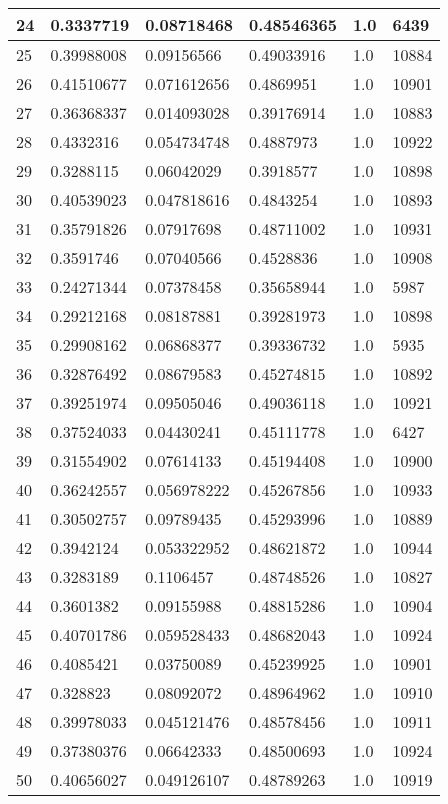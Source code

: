 \begin{longtable}{|l|l|l|l|l|l|}
24 & 0.3337719 & 0.08718468 & 0.48546365 & 1.0 & 6439 \\ \hline 
25 & 0.39988008 & 0.09156566 & 0.49033916 & 1.0 & 10884 \\ \hline 
26 & 0.41510677 & 0.071612656 & 0.4869951 & 1.0 & 10901 \\ \hline 
27 & 0.36368337 & 0.014093028 & 0.39176914 & 1.0 & 10883 \\ \hline 
28 & 0.4332316 & 0.054734748 & 0.4887973 & 1.0 & 10922 \\ \hline 
29 & 0.3288115 & 0.06042029 & 0.3918577 & 1.0 & 10898 \\ \hline 
30 & 0.40539023 & 0.047818616 & 0.4843254 & 1.0 & 10893 \\ \hline 
31 & 0.35791826 & 0.07917698 & 0.48711002 & 1.0 & 10931 \\ \hline 
32 & 0.3591746 & 0.07040566 & 0.4528836 & 1.0 & 10908 \\ \hline 
33 & 0.24271344 & 0.07378458 & 0.35658944 & 1.0 & 5987 \\ \hline 
34 & 0.29212168 & 0.08187881 & 0.39281973 & 1.0 & 10898 \\ \hline 
35 & 0.29908162 & 0.06868377 & 0.39336732 & 1.0 & 5935 \\ \hline 
36 & 0.32876492 & 0.08679583 & 0.45274815 & 1.0 & 10892 \\ \hline 
37 & 0.39251974 & 0.09505046 & 0.49036118 & 1.0 & 10921 \\ \hline 
38 & 0.37524033 & 0.04430241 & 0.45111778 & 1.0 & 6427 \\ \hline 
39 & 0.31554902 & 0.07614133 & 0.45194408 & 1.0 & 10900 \\ \hline 
40 & 0.36242557 & 0.056978222 & 0.45267856 & 1.0 & 10933 \\ \hline 
41 & 0.30502757 & 0.09789435 & 0.45293996 & 1.0 & 10889 \\ \hline 
42 & 0.3942124 & 0.053322952 & 0.48621872 & 1.0 & 10944 \\ \hline 
43 & 0.3283189 & 0.1106457 & 0.48748526 & 1.0 & 10827 \\ \hline 
44 & 0.3601382 & 0.09155988 & 0.48815286 & 1.0 & 10904 \\ \hline 
45 & 0.40701786 & 0.059528433 & 0.48682043 & 1.0 & 10924 \\ \hline 
46 & 0.4085421 & 0.03750089 & 0.45239925 & 1.0 & 10901 \\ \hline 
47 & 0.328823 & 0.08092072 & 0.48964962 & 1.0 & 10910 \\ \hline 
48 & 0.39978033 & 0.045121476 & 0.48578456 & 1.0 & 10911 \\ \hline 
49 & 0.37380376 & 0.06642333 & 0.48500693 & 1.0 & 10924 \\ \hline 
50 & 0.40656027 & 0.049126107 & 0.48789263 & 1.0 & 10919 \\ \hline 
\end{longtable}